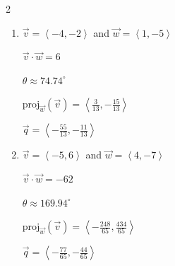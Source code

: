\documentclass{ximera}
\begin{document}
\begin{multicols}{2} \raggedcolumns 
\begin{enumerate}
\setcounter{enumi}{\value{HW}}


\item $\overrightarrow{v} = \left\langle -4, -2 \right\rangle$ and $\overrightarrow{w} = \left\langle 1, -5 \right\rangle$

 $\overrightarrow{v} \cdot \overrightarrow{w} = 6$

 $\theta \approx  74.74^{\circ}$ 

 $\text{proj}_{\overrightarrow{w}}(\overrightarrow{v}) = \left\langle \frac{3}{13}, -\frac{15}{13} \right\rangle$

 $\overrightarrow{q} = \left\langle -\frac{55}{13}, -\frac{11}{13} \right\rangle$

\vfill

\item $\overrightarrow{v} = \left\langle -5, 6 \right\rangle$ and $\overrightarrow{w} = \left\langle 4, -7 \right\rangle$

 $\overrightarrow{v} \cdot \overrightarrow{w} = -62$

 $\theta  \approx  169.94^{\circ}$ 

 $\text{proj}_{\overrightarrow{w}}(\overrightarrow{v}) = \left\langle -\frac{248}{65}, \frac{434}{65} \right\rangle$

 $\overrightarrow{q} = \left\langle -\frac{77}{65}, -\frac{44}{65} \right\rangle$
 
\setcounter{HW}{\value{enumi}}
\end{enumerate}
\end{multicols}
 
 

 
 
\end{document}
